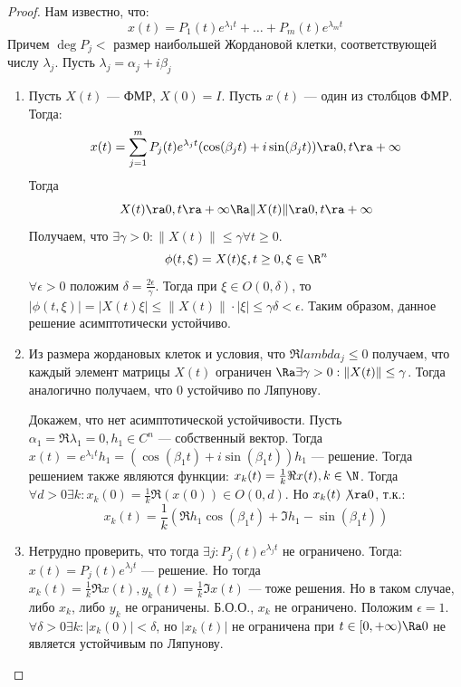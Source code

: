 \begin{proof}
    Нам известно, что:
    \begin{equation}
        x(t) = P_1(t)e^{\lambda_1t} + \dots + P_m(t)e^{\lambda_mt}
    \end{equation}
    Причем \(\deg P_j <\) размер наибольшей Жордановой клетки, соответствующей числу \(\lambda_j\). Пусть \(\lambda_j = \alpha_j + i\beta_j\)
    \begin{enumerate}
        \item Пусть \(X(t)\) --- ФМР, \(X(0) = I\). Пусть \(x(t)\) --- один из столбцов ФМР. Тогда:
        \[x(t) = \sum_{j = 1}^m P_j(t)e^{\lambda_jt}(\cos(\beta_jt) + i\sin(\beta_j t)) \ra 0, t \ra +\infty\]
        Тогда
        \begin{equation}
            X(t) \ra 0, t \ra +\infty \Ra \|X(t)\| \ra 0, t \ra +\infty
        \end{equation}
        Получаем, что \(\exists \gamma > 0: \|X(t)\| \le \gamma \forall t \ge 0\).
        \[\phi(t, \xi) = X(t)\xi, t \ge 0, \xi \in \R^n\]
        \(\forall \epsilon > 0 \) положим \(\delta = \frac{2\epsilon}{\gamma}\). Тогда при \(\xi \in O(0, \delta)\), то \(|\phi(t, \xi)| = |X(t)\xi| \le \|X(t)\| \cdot |\xi| \le \gamma \delta < \epsilon\). Таким образом, данное решение асимптотически устойчиво.

        \item Из размера жордановых клеток и условия, что \(\Re lambda_j \le 0\) получаем, что каждый элемент матрицы \(X(t)\) ограничен \(\Ra \exists \gamma > 0: \|X(t)\| \le \gamma\). Тогда аналогично получаем, что \(0\) устойчиво по Ляпунову.
        
        Докажем, что нет асимптотической устойчивости. Пусть \(\alpha_1 = \Re \lambda_1 = 0, h_1 \in C^n\) --- собственный вектор. Тогда \(x(t) = e^{\lambda_1t}h_1 = (\cos(\beta_1 t) + i\sin(\beta_1 t))h_1\) --- решение. Тогда решением также являются функции: \(x_k(t) = \frac{1}{k} \Re x(t), k \in \N\). Тогда \(\forall d > 0 \exists k: x_k(0) = \frac{1}{k}\Re(x(0)) \in O(0, d)\). Но \(x_k(t) \not\ra 0\), т.к.:
        \[x_k(t) = \frac{1}{k}(\Re h_1 \cos(\beta_1 t) + \Im h_1 - \sin(\beta_1 t))\]
        
        \item Нетрудно проверить, что тогда \(\exists j: P_j(t)e^{\lambda_j t}\) не ограничено. Тогда: \(x(t) = P_j(t)e^{\lambda_j t}\) --- решение. Но тогда \(x_k(t) = \frac{1}{k} \Re x(t), y_k(t) = \frac{1}{k} \Im x(t)\) --- тоже решения. Но в таком случае, либо \(x_k\), либо \(y_k\) не ограничены. Б.О.О., \(x_k\) не ограничено. Положим \(\epsilon = 1\). \(\forall \delta > 0 \exists k: |x_k(0)| < \delta\), но \(|x_k(t)|\) не ограничена при \(t \in [0, +\infty) \Ra 0\) не является устойчивым по Ляпунову.
    \end{enumerate}
\end{proof}


